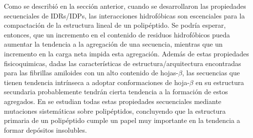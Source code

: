 Como se describió en la sección anterior, cuando se desarrollaron las propiedades secuenciales de IDRs/IDPs, las interacciones hidrofóbicas son escenciales para la compactación de la estructura lineal de un polipéptido.
Se podría esperar, entonces, que un incremento en el contenido de residuos hidrofóbicos pueda aumentar la tendencia a la agregación de una secuencia, mientras que un incremento en la carga neta impida esta agregación. 
Además de estas propiedades fisicoquimicas, dadas las características de estructura/arquitectura encontradas para las fibrillas amiloides con un alto contenido de hojas-$\beta$,
las secuencias que tienen tendencia intrínseca a adoptar conformaciones de hoja-$\beta$ en su estructura secundaria probablemente tendrán cierta tendencia a la formación de estos agregados.  
En \cite{chiti2003rationalization} se estudian todas estas propiedades secuenciales mediante mutaciones sistemáticas sobre polipéptidos, concluyendo 
que la estructura primaria de un polipéptido cumple un papel muy importante en la tendencia a formar depósitos insolubles.



